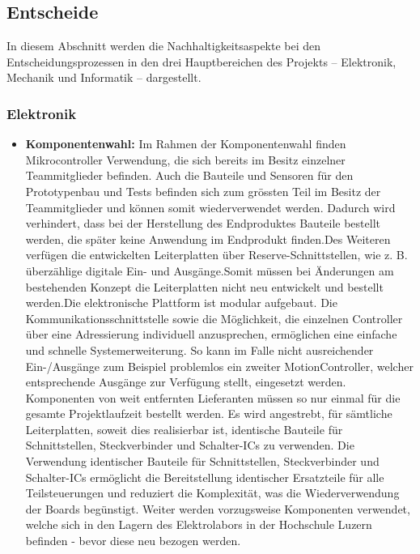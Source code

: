 \documentclass[../../main.tex]{subfiles} %
\begin{document}
\subsection{Entscheide}

In diesem Abschnitt werden die Nachhaltigkeitsaspekte bei den
Entscheidungsprozessen in den drei Hauptbereichen des Projekts – Elektronik,
Mechanik und Informatik – dargestellt.

\subsubsection{Elektronik}

\begin{itemize}
      \item \textbf{Komponentenwahl:} Im Rahmen der Komponentenwahl finden Mikrocontroller Verwendung,
            die sich bereits im Besitz einzelner Teammitglieder befinden. Auch die Bauteile und Sensoren für
            den Prototypenbau und Tests befinden sich zum grössten Teil im Besitz der Teammitglieder und
            können somit wiederverwendet werden. Dadurch wird verhindert, dass bei der Herstellung des
            Endproduktes Bauteile bestellt werden, die später keine Anwendung im Endprodukt finden.Des
            Weiteren verfügen die entwickelten Leiterplatten über Reserve-Schnittstellen, wie z. B.
            überzählige digitale Ein- und Ausgänge.Somit müssen bei Änderungen am bestehenden Konzept die Leiterplatten
            nicht neu entwickelt und bestellt werden.Die elektronische Plattform ist modular aufgebaut. Die
            Kommunikationsschnittstelle sowie die Möglichkeit, die einzelnen Controller über eine Adressierung
            individuell anzusprechen, ermöglichen eine einfache und schnelle Systemerweiterung. So kann im Falle nicht ausreichender
            Ein-/Ausgänge zum Beispiel problemlos ein zweiter MotionController, welcher entsprechende Ausgänge zur Verfügung stellt,
            eingesetzt werden. Komponenten von weit entfernten Lieferanten müssen so nur einmal für die
            gesamte Projektlaufzeit bestellt werden. Es wird angestrebt, für sämtliche Leiterplatten, soweit
            dies realisierbar ist, identische Bauteile für Schnittstellen, Steckverbinder und Schalter-ICs zu
            verwenden. Die Verwendung identischer Bauteile für Schnittstellen, Steckverbinder und Schalter-ICs
            ermöglicht die Bereitstellung identischer Ersatzteile für alle Teilsteuerungen und reduziert
            die Komplexität, was die Wiederverwendung der Boards begünstigt.
            Weiter werden vorzugsweise Komponenten verwendet, welche sich in den Lagern des Elektrolabors in der
            Hochschule Luzern befinden - bevor diese neu bezogen werden.


\end{itemize}
\end{document}
